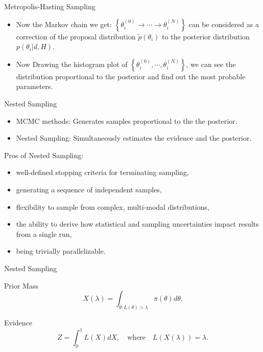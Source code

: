 \documentclass[xcolor=dvipsnames]{beamer}
\begin{document}
\begin{frame}[t]{Metropolis-Hasting Sampling}
  \begin{itemize}
    \item Now the Markov chain we get: $\left\{ \theta_i^{(0)} \rightarrow \cdots \rightarrow \theta_i^{(N)} \right\}$ can be considered as a correction of the proposal distribution $\tilde{p}(\theta_i)$ to the posterior distribution $p(\theta_i | d, H)$.
    \item Now Drawing the histogram plot of $\left\{ \theta_i^{(0)}, \cdots, \theta_i^{(N)} \right\}$, we can see the distribution proportional to the posterior and find out the most probable parameters.
  \end{itemize}
\end{frame}

\begin{frame}[t]{Nested Sampling}
  \begin{itemize}
    \item MCMC methods: Generates samples proportional to the the posterior.
    \item Nested Sampling: Simultaneously estimates the evidence and the posterior.
  \end{itemize}
  Pros of Nested Sampling:
  \begin{itemize}
    \item well-defined stopping criteria for terminating sampling,
    \item generating a sequence of independent samples,
    \item flexibility to sample from complex, multi-modal distributions,
    \item the ability to derive how statistical and sampling uncertainties impact results from a single run,
    \item being trivially parallelizable.
  \end{itemize}
\end{frame}

\begin{frame}[t]{Nested Sampling}
  \begin{block}{Prior Mass}
    \begin{equation*}
      X(\lambda) = \int_{\theta: L(\theta) > \lambda} \pi(\theta) d\theta.
    \end{equation*}
  \end{block}
  \begin{block}{Evidence}
    \begin{equation*}
      Z = \int_0^1 L(X) dX, \quad \text{where} \quad L(X(\lambda)) = \lambda.
    \end{equation*}
  \end{block}
\end{frame}
\end{document}
